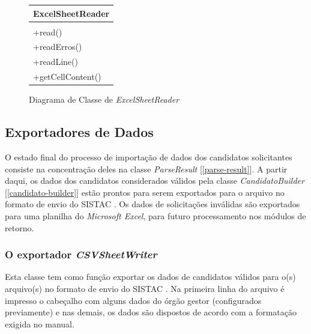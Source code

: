 \documentclass[
	12pt,			%
	openright,		%
	oneside,	
	a4paper,		%
	english,		%
	brazil			%
]{abntex2/abntex2}  %
\begin{document}
					\begin{figure}[ht]
						\begin{center}
							
							\caption{Diagrama de Classe de \textit{ExcelSheetReader}}
							
							\begin{tabular}{|l|}
								\hline
								\multicolumn{1}{|c|}{\textbf{ExcelSheetReader}} \\ \hline
								\\ \hline
								+read() \\
								+readErros() \\
								+readLine() \\
								+getCellContent() \\ \hline
							\end{tabular}
							
						\end{center}
					\end{figure}
	
			\subsection{Exportadores de Dados}
	
				O estado final do processo de importação de dados dos candidatos solicitantes consiste na concentração deles na classe \textit{ParseResult} [\ref{parse-result}]. A partir daqui, os dados dos candidatos considerados válidos pela classe \textit{CandidatoBuilder} [\ref{candidato-builder}] estão prontos para serem exportados para o arquivo no formato de envio do SISTAC \cite{sistac-formatos}. Os dados de solicitações inválidas são exportados para uma planilha do \textit{Microsoft Excel}, para futuro processamento nos módulos de retorno.
	
				\subsubsection{O exportador \textit{CSVSheetWriter}}
	
					Esta classe tem como função exportar os dados de candidatos válidos para o(s) arquivo(s) no formato de envio do SISTAC \cite{sistac-formatos}. Na primeira linha do arquivo é impresso o cabeçalho com alguns dados do órgão gestor (configurados previamente) e nas demais, os dados são dispostos de acordo com a formatação exigida no manual.
	
\end{document}
